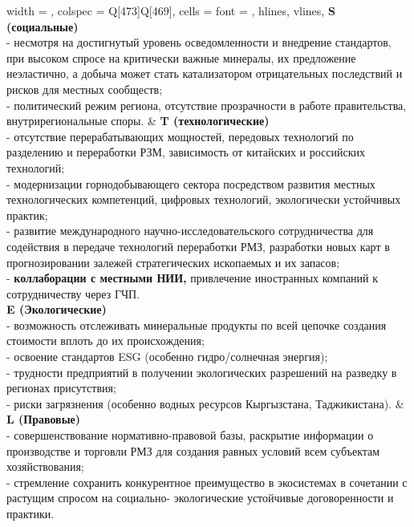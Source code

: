 \begin{longtblr}[
  label = none,
  entry = none,
]{
  width = \linewidth,
  colspec = {Q[473]Q[469]},
  cells = {font = \footnotesize},
  hlines,
  vlines,
}
{\textbf{S (социальные)}\\- несмотря на достигнутый уровень осведомленности и внедрение стандартов, при высоком спросе на критически важные минералы, их предложение неэластично, а добыча может стать катализатором отрицательных последствий и рисков для местных сообществ;\\- политический режим региона, отсутствие прозрачности в работе правительства, внутрирегиональные споры.} & {\textbf{T (технологические)}\\- отсутствие перерабатывающих мощностей, передовых технологий по разделению и переработки РЗМ, зависимость от китайских и российских технологий;\\- модернизации горнодобывающего сектора посредством развития местных технологических компетенций, цифровых технологий, экологически устойчивых практик;\\- развитие международного научно-исследовательского сотрудничества для содействия в передаче технологий переработки РМЗ, разработки новых карт в прогнозировании залежей стратегических ископаемых и их запасов;\\- \textbf{коллаборации с местными НИИ, }привлечение иностранных компаний к сотрудничеству через ГЧП.} \\
{\textbf{E (Экологические)}\\- возможность отслеживать минеральные продукты по всей цепочке создания стоимости вплоть до их происхождения;\\- освоение стандартов ESG (особенно гидро/солнечная энергия);\\- трудности предприятий в получении экологических разрешений на разведку в регионах присутствия;\\- риски загрязнения (особенно водных ресурсов Кыргызстана, Таджикистана).} & {\textbf{L (Правовые)}\\- совершенствование нормативно-правовой базы, раскрытие информации о производстве и торговли РМЗ для создания равных условий всем субъектам хозяйствования;\\- стремление сохранить конкурентное преимущество в экосистемах в сочетании с растущим спросом на социально- экологические устойчивые договоренности и практики.} 
\end{longtblr}

